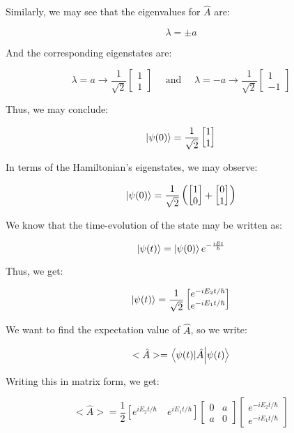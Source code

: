 \begin{enumerate}
    Similarly, we may see that the eigenvalues for $\hat{A}$ are:

    $$\lambda=\pm a$$

    And the corresponding eigenstates are:

    $$\lambda=a\to\frac{1}{\sqrt{2}}\left[ \begin{matrix} 1\\1\end{matrix} \right]\quad\text{ and }\quad \lambda=-a\to\frac{1}{\sqrt{2}}\left[ \begin{matrix} 1\\-1\end{matrix} \right]$$

    Thus, we may conclude:

    $$\ket{\psi(0)}=\frac{1}{\sqrt{2}}\left[ \begin{matrix} 1\\1\end{matrix} \right]$$

    In terms of the Hamiltonian's eigenstates, we may observe:

    $$\ket{\psi(0)}=\frac{1}{\sqrt{2}}\left(\left[ \begin{matrix} 1\\0\end{matrix} \right]+\left[ \begin{matrix} 0\\1\end{matrix} \right]\right)$$

    We know that the time-evolution of the state may be written as:

    $$\ket{\psi(t)}=\ket{\psi(0)}e^{-\frac{iEt}{\hbar}}$$

    Thus, we get:

    $$\ket{\psi(t)}=\frac{1}{\sqrt{2}}\left[ \begin{matrix} e^{-iE_2t/\hbar}\\ e^{-iE_1t/\hbar} \end{matrix}\right]$$

    We want to find the expectation value of $\hat{A}$, so we write:

    $$<\hat{A}>=\bra{\psi(t)|\hat{A}}\ket{\psi(t)}$$

    Writing this in matrix form, we get:

    $$<\hat{A}>=\frac{1}{2}\left[ e^{iE_2t/\hbar}\quad e^{iE_1t/\hbar} \right]\left[ \begin{matrix} 0 & a\\a & 0\end{matrix} \right]\left[ \begin{matrix} e^{-iE_2t/\hbar}\\ e^{-iE_1t/\hbar} \end{matrix}\right]$$


\end{enumerate}
